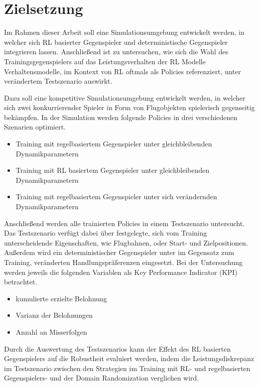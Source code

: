 \section{Zielsetzung}

Im Rahmen dieser Arbeit soll eine Simulationsumgebung entwickelt werden, in welcher sich RL basierter Gegenspieler und deterministische Gegenspieler integrieren lassen.
Anschließend ist zu untersuchen, wie sich die Wahl des Trainingsgegenspielers auf das Leistungsverhalten der RL Modelle Verhaltensmodelle, im Kontext von RL oftmals als Policies referenziert, unter verändertem Testszenario auswirkt.

Dazu soll eine kompetitive Simulationsumgebung entwickelt werden, in welcher sich zwei konkurrierender Spieler in Form von Flugobjekten spielerisch gegenseitig bekämpfen.
In der Simulation werden folgende Policies in drei verschiedenen Szenarien optimiert.

\begin{itemize}
    \item Training mit regelbasiertem Gegenspieler unter gleichbleibenden Dynamikparametern
    \item Training mit RL basiertem Gegenspieler unter gleichbleibenden Dynamikparametern
    \item Training mit regelbasiertem Gegenspieler unter sich verändernden Dynamikparametern
\end{itemize}

Anschließend werden alle trainierten Policies in einem Testszenario untersucht.
Das Testszenario verfügt dabei über festgelegte, sich vom Training unterscheidende Eigenschaften, wie Flugbahnen, oder Start- und Zielpositionen.
Außerdem wird ein deterministischer Gegenspieler unter im Gegensatz zum Training, veränderten Handlungspräferenzen eingesetzt.
Bei der Untersuchung werden jeweils die folgenden Variablen als Key Performance Indicator (KPI) betrachtet.
\begin{itemize}
    \item kumulierte erzielte Belohnung
    \item Varianz der Belohnungen
    \item Anzahl an Misserfolgen
\end{itemize}

Durch die Auswertung des Testszenarios kann der Effekt des RL basierten Gegenspielers auf die Robustheit evaluiert werden, indem die Leistungsdiskrepanz im Testszenario zwischen den Strategien im Training mit RL- und regelbasierten Gegenspielers- und der Domain Randomization verglichen wird.

